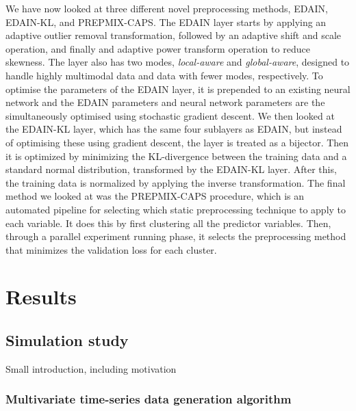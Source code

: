 \documentclass{statsmsc}
\begin{document}
{We have now looked at three different novel preprocessing methods,
\ac{EDAIN}, \ac{EDAIN-KL}, and \ac{PREPMIX-CAPS}. The \ac{EDAIN} layer starts by applying
an adaptive outlier removal transformation, followed by an adaptive shift and scale operation,
and finally and adaptive power transform operation to reduce skewness. The layer also has
two modes, \textit{local-aware} and \textit{global-aware}, designed to handle highly
multimodal data and data with fewer modes, respectively. To optimise the parameters of
the \ac{EDAIN} layer, it is prepended to an existing neural network and the
\ac{EDAIN} parameters and neural network parameters are the simultaneously optimised using
stochastic gradient descent. We then looked at the \ac{EDAIN-KL} layer, which has the same
four sublayers as \ac{EDAIN}, but instead of optimising these using gradient descent, the layer
is treated as a bijector. Then it is optimized by minimizing the \ac{KL-divergence} between the
training data and a standard  normal distribution, transformed by the \ac{EDAIN-KL} layer.
After this, the training data is normalized by applying the inverse transformation.
The final method we looked at was the \ac{PREPMIX-CAPS} procedure, which is an automated
pipeline for selecting which static preprocessing technique to apply to each variable. It does this
by first clustering all the predictor variables. Then, through a parallel experiment
running phase, it selects the preprocessing method that minimizes the validation loss for each
cluster.


\chapter{Results} %


\section{Simulation study}%
\label{sec:Simulation study}%

Small introduction, including motivation

\subsection{Multivariate time-series data generation algorithm}%
\label{sub:Multivariate time-series data generation algorithm}



}
\end{document}
